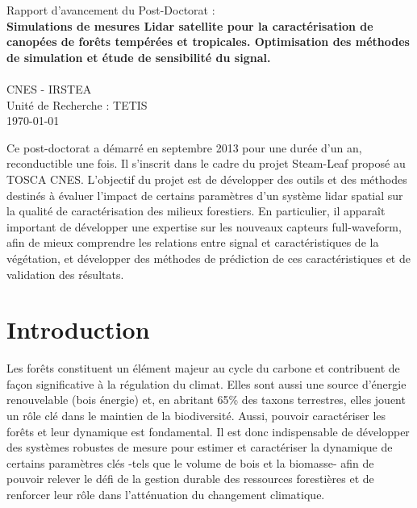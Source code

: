 \documentclass[a4paper,11pt]{article}
\begin{document}
\begin{center}
 \Large Rapport d'avancement du Post-Doctorat :\\[1cm]
 \LARGE \textbf{Simulations de mesures Lidar satellite pour la caractérisation de canopées de forêts tempérées et tropicales. Optimisation des méthodes de simulation et étude de sensibilité du signal.}\\[1cm]
 
 \\[1cm]
 CNES - IRSTEA \\[1cm]
 
\large Unité  de Recherche  : TETIS\\[0.5cm]
 \today
\end{center}

\vspace{1.5cm}

\renewcommand{\contentsname}{}
\tableofcontents

\clearpage


Ce post-doctorat a démarré en septembre 2013 pour une durée d'un an, reconductible une fois. Il s'inscrit dans le cadre du projet Steam-Leaf proposé au TOSCA CNES. L'objectif du projet est de  développer des outils et des méthodes destinés à évaluer l'impact de certains paramètres d'un système lidar spatial sur la qualité de caractérisation des milieux forestiers. En particulier, il apparaît important de développer une expertise sur les nouveaux capteurs full-waveform, afin de mieux comprendre les relations entre signal et caractéristiques de la végétation, et développer des méthodes de prédiction de ces caractéristiques et de validation des résultats.


\section{Introduction}
Les forêts  constituent un élément majeur au cycle du carbone et contribuent de façon significative à la régulation du climat. Elles sont aussi une source d'énergie renouvelable (bois énergie) et, en abritant 65\% des taxons terrestres, elles jouent  un rôle clé dans le maintien de la biodiversité. Aussi, pouvoir caractériser les forêts et leur dynamique est fondamental. Il est donc indispensable de développer des systèmes robustes de mesure pour estimer et caractériser la dynamique de certains paramètres clés -tels que le volume de bois et la biomasse- afin de pouvoir relever le défi de la gestion durable des ressources forestières et de renforcer leur rôle dans l'atténuation du changement climatique.
\end{document}
